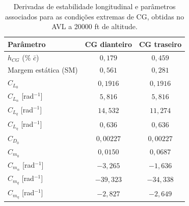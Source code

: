 \begin{table}[H]
    \centering
    \caption{Derivadas de estabilidade longitudinal e parâmetros associados para as condições extremas de CG, obtidas no AVL a 20000 ft de altitude.}
    \begin{tabular}{|l|c|c|}
       \hline
       \textbf{Parâmetro} & \textbf{CG dianteiro} & \textbf{CG traseiro} \\
       \hline
       $h_{CG}$ (\%  $\bar{c}$)        & $0{,}179$   & $0{,}459$  \\
       \hline
       Margem estática (SM)              & $0{,}561$   & $0{,}281$  \\
       \hline
       $C_{L_0}$                         & $0{,}1916$  & $0{,}1916$ \\
       \hline
       $C_{L_\alpha}$ [rad$^{-1}$]       & $5{,}816$   & $5{,}816$  \\
       \hline
       $C_{L_q}$ [rad$^{-1}$]            & $14{,}532$  & $11{,}274$ \\
       \hline
       $C_{L_\eta}$ [rad$^{-1}$]         & $0{,}636$   & $0{,}636$  \\
       \hline
       $C_{D_0}$                         & $0{,}00227$ & $0{,}00227$\\
       \hline
       $C_{m_0}$                         & $0{,}0150$  & $0{,}0687$ \\
       \hline
       $C_{m_\alpha}$ [rad$^{-1}$]       & $-3{,}265$  & $-1{,}636$ \\
       \hline
       $C_{m_q}$ [rad$^{-1}$]            & $-39{,}323$ & $-34{,}338$\\
       \hline
       $C_{m_\eta}$ [rad$^{-1}$]         & $-2{,}827$  & $-2{,}649$ \\
       \hline
    \end{tabular}
    \label{tab:derivadas_long_anexo}
\end{table}


